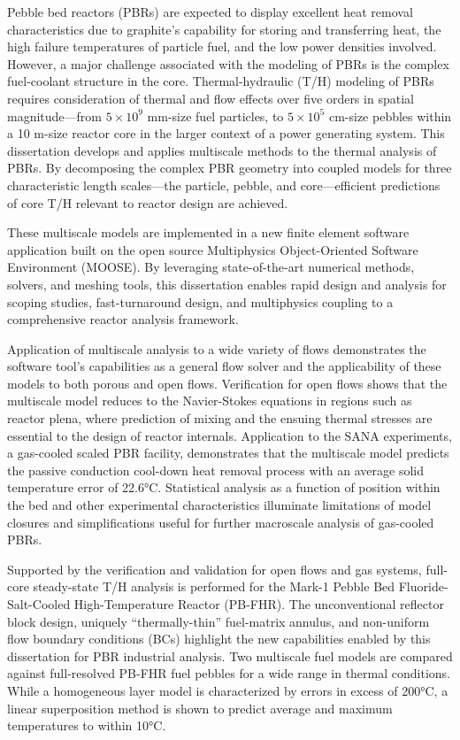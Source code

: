 \documentclass{ucbthesis}
\newcommand{\mdash}
           {\discretionary{}{}{\kern 0.1em}---\discretionary{}{}{\kern 0.1em}}
\begin{document}
\noindent Pebble bed reactors (PBRs) are expected to display excellent heat removal characteristics due to graphite's capability for storing and transferring heat, the high failure temperatures of particle fuel, and the low power densities involved. However, a major challenge associated with the modeling of PBRs is the complex fuel-coolant structure in the core. Thermal-hydraulic (T/H) modeling of PBRs requires consideration of thermal and flow effects over five orders in spatial magnitude\mdash from \(5\times10^9\) \si{\milli\meter}-size fuel particles, to \(5\times10^5\) \si{\centi\meter}-size pebbles within a 10 \si{\meter}-size reactor core in the larger context of a power generating system. This dissertation develops and applies multiscale methods to the thermal analysis of PBRs. By decomposing the complex PBR geometry into coupled models for three characteristic length scales\mdash the particle, pebble, and core\mdash efficient predictions of core T/H relevant to reactor design are achieved.

These multiscale models are implemented in a new finite element software application built on the open source Multiphysics Object-Oriented Software Environment (MOOSE). By leveraging state-of-the-art numerical methods, solvers, and meshing tools, this dissertation enables rapid design and analysis for scoping studies, fast-turnaround design, and multiphysics coupling to a comprehensive reactor analysis framework. 

Application of multiscale analysis to a wide variety of flows demonstrates the software tool's capabilities as a general flow solver and the applicability of these models to both porous and open flows. Verification for open flows shows that the multiscale model reduces to the Navier-Stokes equations in regions such as reactor plena, where prediction of mixing and the ensuing thermal stresses are essential to the design of reactor internals. Application to the SANA experiments, a gas-cooled scaled PBR facility, demonstrates that the multiscale model predicts the passive conduction cool-down heat removal process with an average solid temperature error of 22.6\si{\celsius}. Statistical analysis as a function of position within the bed and other experimental characteristics illuminate limitations of model closures and simplifications useful for further macroscale analysis of gas-cooled PBRs.

Supported by the verification and validation for open flows and gas systems, full-core steady-state T/H analysis is performed for the Mark-1 Pebble Bed Fluoride-Salt-Cooled High-Temperature Reactor (PB-FHR). The unconventional reflector block design, uniquely ``thermally-thin'' fuel-matrix annulus, and non-uniform flow boundary conditions (BCs) highlight the new capabilities enabled by this dissertation for PBR industrial analysis. Two multiscale fuel models are compared against full-resolved PB-FHR fuel pebbles for a wide range in thermal conditions. While a homogeneous layer model is characterized by errors in excess of 200\si{\celsius}, a linear superposition method is shown to predict average and maximum temperatures to within 10\si{\celsius}. 
\end{document}
